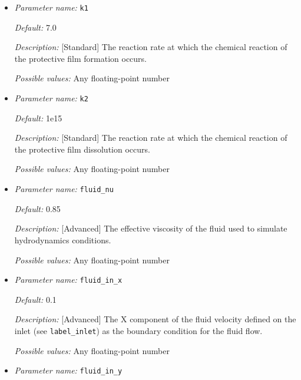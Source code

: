 \begin{itemize}
\item {\it Parameter name:} {\tt k1}
\label{parameters:k1}


{\it Default:} 7.0

{\it Description:} [Standard] The reaction rate at which the chemical reaction of the protective film formation occurs.

{\it Possible values:} Any floating-point number


\item {\it Parameter name:} {\tt k2}
\label{parameters:k2}


{\it Default:} 1e15

{\it Description:} [Standard] The reaction rate at which the chemical reaction of the protective film dissolution occurs.

{\it Possible values:} Any floating-point number


\item {\it Parameter name:} {\tt fluid\_nu}
\label{parameters:fluid_nu}


{\it Default:} 0.85

{\it Description:} [Advanced] The effective viscosity of the fluid used to simulate hydrodynamics conditions.

{\it Possible values:} Any floating-point number


\item {\it Parameter name:} {\tt fluid\_in\_x}
\label{parameters:fluid_in_x}


{\it Default:} 0.1

{\it Description:} [Advanced] The X component of the fluid velocity defined on the inlet (see {\tt label\_inlet}) as the boundary condition for the fluid flow.

{\it Possible values:} Any floating-point number


\item {\it Parameter name:} {\tt fluid\_in\_y}
\label{parameters:fluid_in_y}


\end{itemize}
